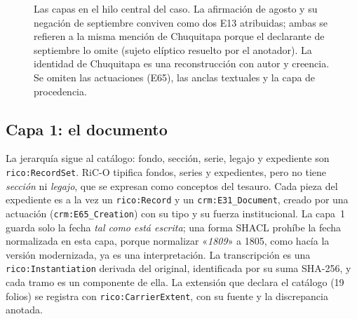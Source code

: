 \documentclass[runningheads]{llncs}
\newcommand{\ttt}[1]{\texttt{\small #1}}
\newcommand{\cita}[1]{«\textit{#1}»}
\begin{document}
\begin{figure}[tb]
{{}}
\caption{Las capas en el hilo central del caso. La afirmación de agosto y su negación de septiembre conviven como dos
E13 atribuidas; ambas se refieren a la misma mención de Chuquitapa porque el declarante de septiembre lo omite
(sujeto elíptico resuelto por el anotador). La identidad de Chuquitapa es una reconstrucción con autor y creencia.
Se omiten las actuaciones (E65), las anclas textuales y la capa de procedencia.}\label{fig:capas}
\end{figure}

\subsection{Capa 1: el documento}
La jerarquía sigue al catálogo: fondo, sección, serie, legajo y expediente son \ttt{rico:RecordSet}. RiC-O tipifica
fondos, series y expedientes, pero no tiene \emph{sección} ni \emph{legajo}, que se expresan como conceptos del
tesauro. Cada pieza del expediente es a la vez un \ttt{rico:Record} y un \ttt{crm:E31\_Document}, creado por una
actuación (\ttt{crm:E65\_Creation}) con su tipo y su fuerza institucional. La capa~1 guarda solo la fecha \emph{tal
como está escrita}; una forma SHACL prohíbe la fecha normalizada en esta capa, porque normalizar \cita{1809} a 1805,
como hacía la versión modernizada, ya es una interpretación. La transcripción es una \ttt{rico:Instantiation}
derivada del original, identificada por su suma SHA-256, y cada tramo es un componente de ella. La extensión que
declara el catálogo (19 folios) se registra con \ttt{rico:CarrierExtent}, con su fuente y la discrepancia anotada.
\end{document}
